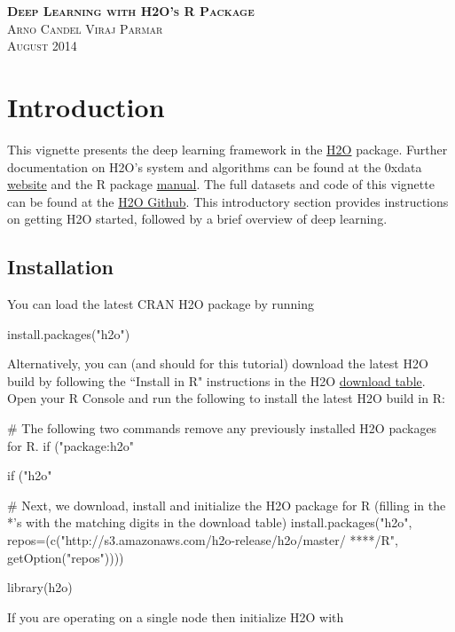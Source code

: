 \documentclass[11pt]{article}
\begin{document}
\thispagestyle{empty} %

\begin{center}
\textsc{\Large\bf{Deep Learning with H2O's R Package}}
\\
\bigskip
\textsc{\small{Arno Candel \hspace{40pt} Viraj Parmar}}
\\
\bigskip
\textsc{August 2014}
\end{center}

\tableofcontents

\newpage


\section{Introduction} \label{1}

This vignette presents the deep learning framework in the \href{http://cran.r-project.org/web/packages/h2o/index.html}{H2O} package. Further documentation on H2O's system and algorithms can be found at the 0xdata \href{http://docs.0xdata.com}{website} and the R package \href{http://cran.r-project.org/web/packages/h2o/h2o.pdf}{manual}. The full datasets and code of this vignette can be found at the \href{https://github.com/0xdata/h2o/tree/master/docs/deeplearning/DeepLearningRVignetteDemo}{H2O Github}. This introductory section provides instructions on getting H2O started, followed by a brief overview of deep learning.

\subsection{Installation} \label{1.1}

You can load the latest CRAN H2O package by running

\begin{spverbatim}
install.packages("h2o")
\end{spverbatim}
\bigskip
\noindent
Alternatively, you can (and should for this tutorial) download the latest H2O build by following the ``Install in R" instructions in the H2O \href{http://s3.amazonaws.com/h2o-release/h2o/master/latest.html}{download table}. Open your R Console and run the following to install the latest H2O build in R:

\begin{spverbatim}
# The following two commands remove any previously installed H2O packages for R.
if ("package:h2o" %

if ("h2o" %

# Next, we download, install and initialize the H2O package for R (filling in the *'s with the matching digits in the download table)
install.packages("h2o", repos=(c("http://s3.amazonaws.com/h2o-release/h2o/master/
****/R", getOption("repos"))))

library(h2o)

\end{spverbatim}
\noindent
If you are operating on a single node then initialize H2O with
\end{document}

